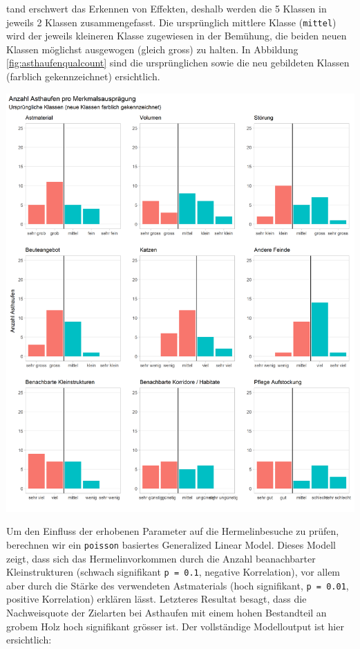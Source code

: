 \documentclass[
  oneside]{scrbook}
\begin{document}
tand erschwert das Erkennen von Effekten, deshalb werden die 5 Klassen in jeweils 2 Klassen zusammengefasst. Die ursprünglich mittlere Klasse (\texttt{mittel}) wird der jeweils kleineren Klasse zugewiesen in der Bemühung, die beiden neuen Klassen möglichst ausgewogen (gleich gross) zu halten. In Abbildung \ref{fig:asthaufenqualcount} sind die ursprünglichen sowie die neu gebildeten Klassen (farblich gekennzeichnet) ersichtlich.

\includegraphics[width=41in]{images/asthaufen_qualitaet_histogramm}

Um den Einfluss der erhobenen Parameter auf die Hermelinbesuche zu prüfen, berechnen wir ein \texttt{poisson} basiertes Generalized Linear Model. Dieses Modell zeigt, dass sich das Hermelinvorkommen durch die Anzahl beanachbarter Kleinstrukturen (schwach signifikant \texttt{p\ =\ 0.1}, negative Korrelation), vor allem aber durch die Stärke des verwendeten Astmaterials (hoch signifikant, \texttt{p\ =\ 0.01}, positive Korrelation) erklären lässt. Letzteres Resultat besagt, dass die Nachweisquote der Zielarten bei Asthaufen mit einem hohen Bestandteil an grobem Holz hoch signifikant grösser ist.
Der vollständige Modelloutput ist hier ersichtlich:
\end{document}
